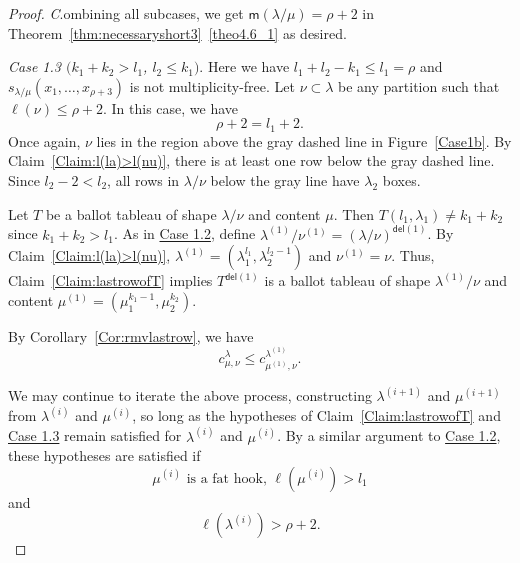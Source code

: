 \documentclass[10pt]{article}
\theoremstyle{definition}
\newcommand{\msf}{\mathsf{m}}
\newcommand{\del}{\mathsf{del}}
\let\hypertargeta\hypertarget %
\let\hyperlinka\hyperlink %
\newenvironment{Case}[1]{\par\vskip2pt\noindent%
\emph{#1}.}{\vskip2pt}
\begin{document}
\begin{proof}
\begin{Case}
Combining all subcases, we get ${\msf }(\lambda/\mu) = \rho+2$ in Theorem~\ref{thm:necessaryshort3}~\ref{theo4.6_1} as desired.
\end{Case}

\begin{Case}
{\hypertargeta{theo4.6_case1.3}{Case 1.3} $(k_1+k_2 > l_1$, $l_2 \leq k_1)$} 
Here we have $l_1+l_2-k_1 \leq l_1 = \rho$ and $s_{\lambda/\mu}(x_1,\ldots,x_{\rho+3})$ is not multiplicity-free. Let $\nu\subset \lambda$ be any partition such that $\ell(\nu)\leq \rho+2$. In this case, we have
\begin{equation}
\label{eq:case1.3rho}
\rho+2 = l_1+2.
\end{equation}
Once again, $\nu$ lies in the region above the gray dashed line in Figure~\ref{Case1b}. By Claim~\ref{Claim:l(la)>l(nu)}, there is at least one row below the gray dashed line. Since $l_2-2 < l_2$, all rows in $\lambda/\nu$ below the gray line have $\lambda_2$ boxes.

Let $T$ be a ballot tableau of shape $\lambda/\nu$ and content $\mu$. Then $T(l_1,\lambda_1)\neq k_1+k_2$ since $k_1+k_2 > l_1$. As in \hyperlinka{theo4.6_case1.2}{Case 1.2}, define $\lambda^{(1)}/ \nu^{(1)} = (\lambda / \nu)^{\del (1)}$. By Claim~\ref{Claim:l(la)>l(nu)}, $\lambda^{(1)} = (\lambda_1^{l_1},\lambda_2^{l_2-1})$ and $\nu^{(1)} = \nu$. Thus, Claim~\ref{Claim:lastrowofT} implies $T^{\del (1)}$ is a ballot tableau of shape $\lambda^{(1)}/\nu$ and content $\mu^{(1)} = (\mu_1^{k_1-1},\mu_2^{k_2})$.

By Corollary~\ref{Cor:rmvlastrow}, we have
\begin{equation}
\label{eq:firstiterationbound1.3}
c^{\lambda}_{\mu,\nu} \leq c^{\lambda^{(1)}}_{\mu^{(1)},\nu}.
\end{equation}

We may continue to iterate the above process, constructing $\lambda^{(i+1)}$ and $\mu^{(i+1)}$ from $\lambda^{(i)}$ and $\mu^{(i)}$, so long as the hypotheses of Claim~\ref{Claim:lastrowofT} and \hyperlinka{theo4.6_case1.3}{Case 1.3} remain satisfied for $\lambda^{(i)}$ and $\mu^{(i)}$. By a similar argument to \hyperlinka{theo4.6_case1.2}{Case 1.2}, these hypotheses are satisfied if
\begin{equation}\label{eqn:condition11}
 \mu^{(i)}\text{ is a fat hook, }\ell(\mu^{(i)}) > l_1
\end{equation}
and 
\begin{equation}\label{eqn:condition1b}
 \ell(\lambda^{(i)}) > \rho+2.
\end{equation}


\end{Case}
\end{proof}
\end{document}
